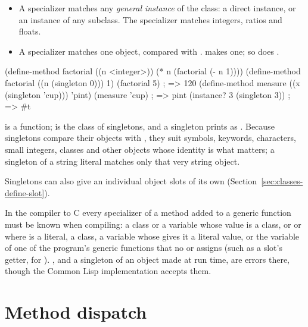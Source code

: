 \begin{itemize}
\item A  specializer matches any \emph{general instance} of the
  class: a direct instance, or an instance of any subclass. The specializer
   matches integers, ratios and floats.
\item A  specializer matches one object, compared with
  .  makes one; so does
  .
\end{itemize}

\begin{dylan}
(define-method factorial ((n <integer>))
  (* n (factorial (- n 1))))
(define-method factorial ((n (singleton 0)))
  1)
(factorial 5)                  ; => 120
(define-method measure ((x (singleton 'cup))) 'pint)
(measure 'cup)                 ; => pint
(instance? 3 (singleton 3))    ; => #t
\end{dylan}

\noindent {} is a function;
 is the class of
singletons, and a singleton prints as . Because
singletons compare their objects with , they suit symbols,
keywords, characters, small integers, classes and other objects whose
identity is what matters; a singleton of a string literal matches only that
very string object.

Singletons can also give an individual object slots of its own
(Section~\ref{sec:classes-define-slot}).

\begin{warnbox}
In the compiler to C every specializer of a method added to a generic
function must be known when compiling: a class or a variable whose value is
a class, or  or  where  is a literal, a class, a variable whose
 gives it a literal value, or the variable of one of the
program's generic functions that no  or  assigns
(such as a slot's getter, for ). , and a
singleton of an object made at run time, are errors there, though the
Common Lisp implementation accepts them.
\end{warnbox}

\section{Method dispatch}\label{sec:functions-dispatch}

